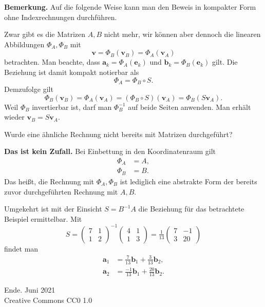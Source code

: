 \documentclass[9pt]{beamer}
\newcommand{\modest}[1]{{\small\color{gray}#1}}
\newcommand{\bv}[1]{\mathbf{#1}}
\newcommand{\strong}[1]{\textsf{\textbf{#1}}}
\begin{document}
\begin{frame}
\strong{Bemerkung.}
Auf die folgende Weise kann man den Beweis in kompakter Form ohne
Indexrechnungen durchführen.\pause

\vspace{1em}
Zwar gibt es die Matrizen $A,B$ nicht mehr, wir können aber dennoch
die linearen Abbildungen $\Phi_A,\Phi_B$ mit
\[\bv v = \Phi_B(\bv v_B) = \Phi_A(\bv v_A)\]
betrachten. Man beachte, dass $\bv a_k = \Phi_A(\bv e_k)$
und $\bv b_k = \Phi_B(\bv e_k)$ gilt. Die Beziehung ist damit
kompakt notierbar als
\[\Phi_A = \Phi_B\circ S.\]\pause
Demzufolge gilt
\[\Phi_B(\bv v_B) = \Phi_A(\bv v_A) = (\Phi_B\circ S)(\bv v_A) = \Phi_B(S\bv v_A).\]
Weil $\Phi_B$ invertierbar ist, darf man $\Phi_B^{-1}$ auf beide
Seiten anwenden. Man erhält wieder $\bv v_B = S\bv v_A$.
\end{frame}

\begin{frame}
Wurde eine ähnliche Rechnung nicht bereits mit Matrizen
durchgeführt?\pause

\vspace{1em}
\strong{Das ist kein Zufall.} Bei Einbettung in den
Koordinatenraum gilt
\begin{align*}
\Phi_A &= A,\\
\Phi_B &= B.
\end{align*}
Das heißt, die Rechnung mit $\Phi_A,\Phi_B$ ist lediglich eine
abstrakte Form der bereits zuvor durchgeführten Rechnung mit
$A,B$.
\end{frame}

\begin{frame}
Umgekehrt ist mit der Einsicht $S = B^{-1}A$ die Beziehung
für das betrachtete Beispiel ermittelbar. Mit
\[S = \begin{pmatrix}7 & 1\\ 1 & 2\end{pmatrix}^{-1}
\begin{pmatrix}4 & 1\\ 1 & 3\end{pmatrix}
= \tfrac{1}{13}\begin{pmatrix}7 & -1\\ 3 & 20\end{pmatrix}\]
findet man
\begin{align*}
\bv a_1 &= \tfrac{7}{13}\bv b_1 + \tfrac{3}{13}\bv b_2,\\
\bv a_2 &= \tfrac{-1}{13}\bv b_1 + \tfrac{20}{13}\bv b_2.
\end{align*}
\end{frame}

\begin{frame}
Ende.
\vfill\hfill\modest{Juni 2021}\\
\hfill\modest{Creative Commons CC0 1.0}
\end{frame}
\end{document}
